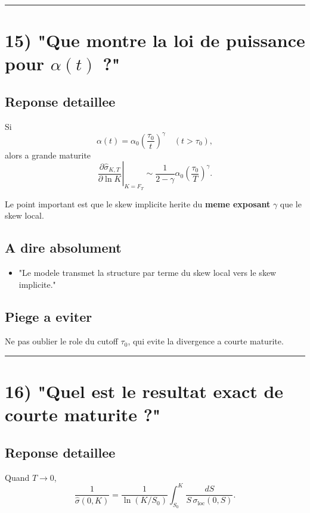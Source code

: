 \documentclass[11pt,a4paper]{article}
\begin{document}
\bigskip\hrule\bigskip

\section{15) "Que montre la loi de puissance pour \(\alpha(t)\) ?"}

\subsection{Reponse detaillee}

Si
\[
\alpha(t)=\alpha_0\left(\frac{\tau_0}{t}\right)^\gamma
\quad (t>\tau_0),
\]
alors a grande maturite
\[
\left.\frac{\partial \hat{\sigma}_{K,T}}{\partial \ln K}\right|_{K=F_T}
\sim
\frac{1}{2-\gamma}\alpha_0\left(\frac{\tau_0}{T}\right)^\gamma.
\]

Le point important est que le skew implicite herite du \textbf{meme exposant} \(\gamma\) que le skew local.

\subsection{A dire absolument}

\begin{itemize}
\item "Le modele transmet la structure par terme du skew local vers le skew implicite."
\end{itemize}

\subsection{Piege a eviter}

Ne pas oublier le role du cutoff \(\tau_0\), qui evite la divergence a courte maturite.

\bigskip\hrule\bigskip

\section{16) "Quel est le resultat exact de courte maturite ?"}

\subsection{Reponse detaillee}

Quand \(T\to 0\),
\[
\frac{1}{\hat{\sigma}(0,K)}
=
\frac{1}{\ln(K/S_0)}
\int_{S_0}^{K}\frac{dS}{S\,\sigma_{\mathrm{loc}}(0,S)}.
\]
\end{document}
